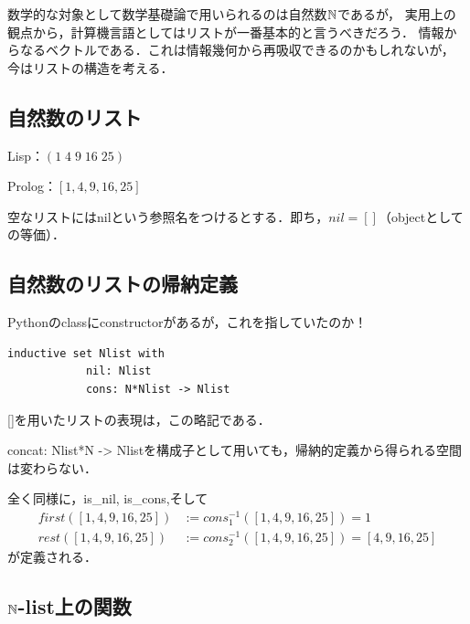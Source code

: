 \documentclass[uplatex, dvipdfmx]{jsreport}
\begin{document}
数学的な対象として数学基礎論で用いられるのは自然数$\mathbb{N}$であるが，
実用上の観点から，計算機言語としてはリストが一番基本的と言うべきだろう．
情報からなるベクトルである．これは情報幾何から再吸収できるのかもしれないが，
今はリストの構造を考える．

\subsection{自然数のリスト}

\begin{notation}[list]
    Lisp：$(1\;4\;9\;16\;25)$

    Prolog：$[1,4,9,16,25]$
\end{notation}
\begin{remark}
    空なリストにはnilという参照名をつけるとする．即ち，$nil=[]$（objectとしての等価）．
\end{remark}

\subsection{自然数のリストの帰納定義}

\begin{definition}[list]
    Pythonのclassにconstructorがあるが，これを指していたのか！
    \begin{lstlisting}[caption=list]
        inductive set Nlist with
            nil: Nlist
            cons: N*Nlist -> Nlist
    \end{lstlisting}
    []を用いたリストの表現は，この略記である．
\end{definition}
\begin{remark}
    concat: Nlist*N -> Nlistを構成子として用いても，帰納的定義から得られる空間は変わらない．
\end{remark}

\begin{example}
    全く同様に，is\_nil, is\_cons,そして
    \begin{align*}
        first([1,4,9,16,25]) &:= cons_1^{-1}([1,4,9,16,25]) = 1\\
        rest([1,4,9,16,25]) &:= cons_2^{-1}([1,4,9,16,25]) = [4,9,16,25]
    \end{align*}
    が定義される．
\end{example}

\subsection{$\mathbb{N}$-list上の関数}
\end{document}

